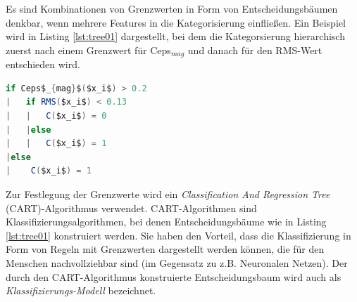 Es sind  Kombinationen von Grenzwerten in Form von Entscheidungsbäumen denkbar, wenn mehrere Features in die Kategorisierung einfließen. Ein Beispiel wird in Listing \ref{lst:tree01} dargestellt, bei dem die Kategorsierung hierarchisch zuerst nach einem Grenzwert für Ceps$_{mag}$ und danach für den RMS-Wert entschieden wird.


\begin{lstlisting}[frame=single,mathescape=true,basicstyle=\footnotesize,language=Java,label=lst:tree01,caption=Beispiel eines CART-Entscheidungsbaums,linewidth=1\textwidth]
if Ceps$_{mag}$($x_i$) > 0.2
|   if RMS($x_i$) < 0.13
|   |   C($x_i$) = 0
|   |else
|   |   C($x_i$) = 1
|else
|    C($x_i$) = 1
\end{lstlisting}


Zur Festlegung der Grenzwerte wird ein \emph{Classification And Regression Tree} (CART)-Algorithmus verwendet. CART-Algorithmen sind Klassifizierungsalgorithmen, bei denen Entscheidungsbäume wie in Listing \ref{lst:tree01} konstruiert werden. Sie haben den Vorteil, dass die Klassifizierung in Form von Regeln mit Grenzwerten dargestellt werden können, die für den Menschen nachvollziehbar sind (im Gegensatz zu z.B. Neuronalen Netzen). Der durch den CART-Algorithmus konstruierte Entscheidungsbaum wird auch als \emph{Klassifizierungs-Modell} bezeichnet.\cite{id3}

